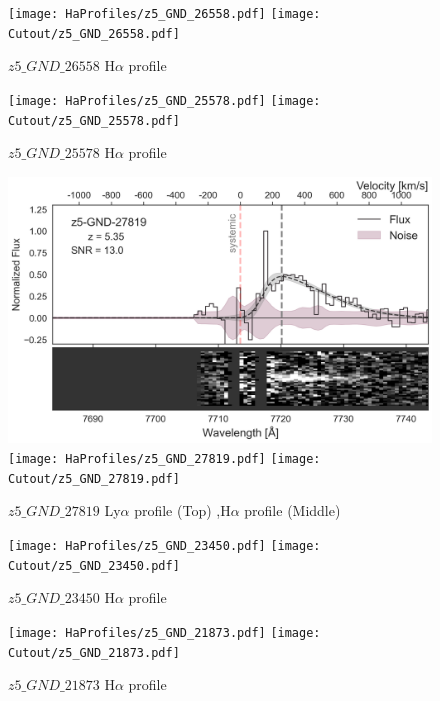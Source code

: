 \documentclass[12pt,english]{article}
\begin{document}
\clearpage
\begin{figure}
\begin{center}\texttt{[image: HaProfiles/z5\_GND\_26558.pdf]}
\texttt{[image: Cutout/z5\_GND\_26558.pdf]}
\caption{$z5\_GND\_26558$ H$\alpha$ profile}
\end{center}
\end{figure}
\clearpage
\begin{figure}
\begin{center}\texttt{[image: HaProfiles/z5\_GND\_25578.pdf]}
\texttt{[image: Cutout/z5\_GND\_25578.pdf]}
\caption{$z5\_GND\_25578$ H$\alpha$ profile}
\end{center}
\end{figure}
\clearpage
\begin{figure}
\begin{center}\includegraphics[width=12cm, trim=0.1cm 0cm 0cm -1cm]{LyaProfiles/z5_GND_27819.png}
\texttt{[image: HaProfiles/z5\_GND\_27819.pdf]}
\texttt{[image: Cutout/z5\_GND\_27819.pdf]}
\caption{$z5\_GND\_27819$ Ly$\alpha$ profile (Top) ,H$\alpha$ profile (Middle)}
\end{center}
\end{figure}
\clearpage
\begin{figure}
\begin{center}\texttt{[image: HaProfiles/z5\_GND\_23450.pdf]}
\texttt{[image: Cutout/z5\_GND\_23450.pdf]}
\caption{$z5\_GND\_23450$ H$\alpha$ profile}
\end{center}
\end{figure}
\clearpage
\begin{figure}
\begin{center}\texttt{[image: HaProfiles/z5\_GND\_21873.pdf]}
\texttt{[image: Cutout/z5\_GND\_21873.pdf]}
\caption{$z5\_GND\_21873$ H$\alpha$ profile}
\end{center}
\end{figure}
\end{document}
